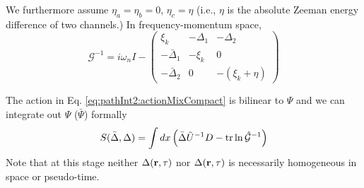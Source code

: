 
We furthermore assume $\eta_{a}=\eta_{b}=0$, $\eta_{c}=\eta$ (i.e., $\eta$ is the absolute Zeeman energy difference of two channels.) In frequency-momentum space, 
\begin{equation}\label{eq:pathInt2:nG}
\mathcal{G}^{-1}=i\omega_{n}I-
\begin{pmatrix}
\xi_{k}&-\Delta_{1}&-\Delta_{2}\\
-\bar{\Delta}_{1}&-\xi_{k}&0\\
-\bar{\Delta}_{2}&0&-(\xi_{k}+\eta)
\end{pmatrix}
\end{equation}



The action in Eq. \ref{eq:pathInt2:actionMixCompact} is  bilinear to $\Psi$ and we can integrate  out $\Psi$ ($\bar\Psi$) formally
\begin{equation}\label{eq:pathInt2:actionD}
S(\bar{\Delta},\Delta)=\int{dx}\left(\bar{\Delta}\tilde{U}^{-1}D-\text{tr}\ln\hat{\mathcal{G}}^{-1}\right)
\end{equation}
Note that at this stage neither $\Delta(\mathbf{r},\tau)$ nor $\Delta(\mathbf{r},\tau)$ is  necessarily homogeneous in space or pseudo-time.  



